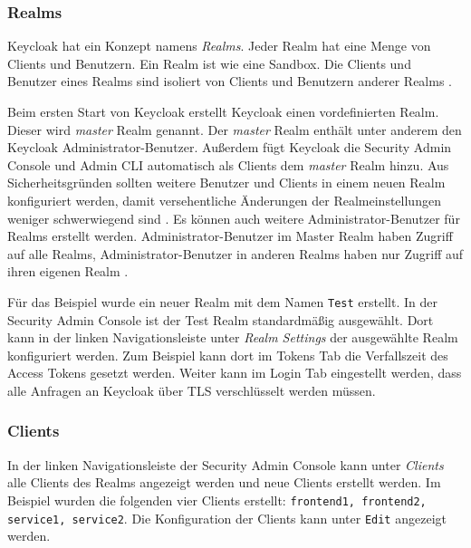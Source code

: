 \subsubsection{Realms}\label{EB_Realms}

Keycloak hat ein Konzept namens \textit{Realms}. Jeder Realm hat eine Menge von Clients und Benutzern. Ein Realm ist wie eine Sandbox. Die Clients und Benutzer eines Realms sind isoliert von Clients und Benutzern anderer Realms \cite[Core Concepts and Terms]{SSEB_keycloakDocs}.

Beim ersten Start von Keycloak erstellt Keycloak einen vordefinierten Realm. Dieser wird \textit{master} Realm genannt. Der \textit{master} Realm enthält unter anderem den Keycloak Administrator-Benutzer. Außerdem fügt Keycloak die Security Admin Console und Admin CLI automatisch als Clients dem \textit{master} Realm hinzu. Aus Sicherheitsgründen sollten weitere Benutzer und Clients in einem neuen Realm konfiguriert werden, damit versehentliche Änderungen der Realmeinstellungen weniger schwerwiegend sind \cite[Master Realm]{SSEB_keycloakDocs}. Es können auch weitere Administrator-Benutzer für Realms erstellt werden. Administrator-Benutzer im Master Realm haben Zugriff auf alle Realms,  Administrator-Benutzer in anderen Realms haben nur Zugriff auf ihren eigenen Realm \cite[Master Realm]{SSEB_keycloakDocs}.

Für das Beispiel wurde ein neuer Realm mit dem Namen \texttt{Test} erstellt. In der Security Admin Console ist der Test Realm standardmäßig ausgewählt. Dort kann in der linken Navigationsleiste unter \textit{Realm Settings} der ausgewählte Realm konfiguriert werden. Zum Beispiel kann dort im Tokens Tab die Verfallszeit des Access Tokens gesetzt werden. Weiter kann im Login Tab eingestellt werden, dass alle Anfragen an Keycloak über TLS verschlüsselt werden müssen.

\subsubsection{Clients}

In der linken Navigationsleiste der Security Admin Console kann unter \textit{Clients} alle Clients des Realms angezeigt werden und neue Clients erstellt werden. Im Beispiel wurden die folgenden vier Clients erstellt: \texttt{frontend1, frontend2, service1, service2}. Die Konfiguration der Clients kann unter \texttt{Edit} angezeigt werden.

